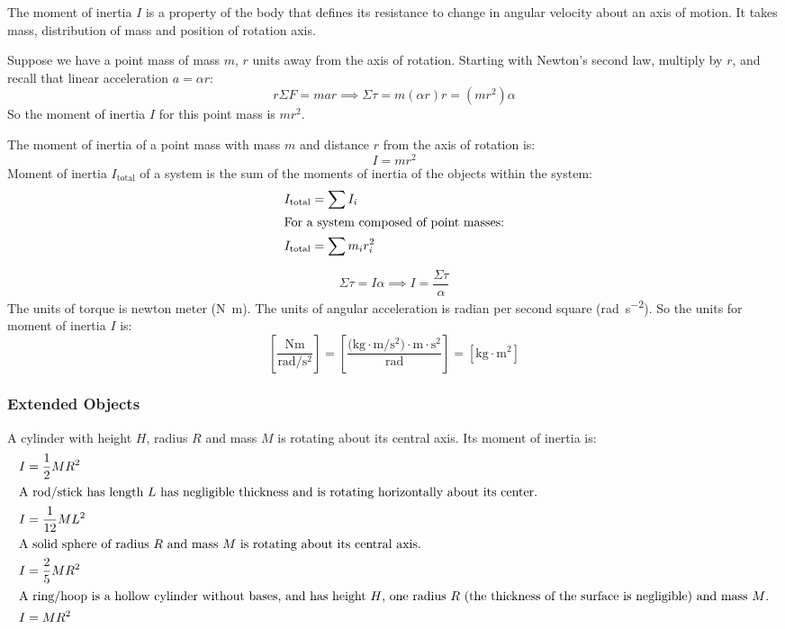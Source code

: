 \documentclass{article}
\newcommand{\theorem}[2]{\begin{tcolorbox}[title={#1},colback=blue!5!white,colframe=blue!75!black,parbox=false] #2 \end{tcolorbox}}
\begin{document}
The moment of inertia $I$ is a property of the body that defines its resistance to change in angular velocity about an axis of motion. It takes mass, distribution of mass and position of rotation axis.

Suppose we have a point mass of mass $m$, $r$ units away from the axis of rotation. Starting with Newton's second law, multiply by $r$, and recall that linear acceleration $a=\alpha r$:
\begin{equation*}
    r\Sigma F=mar
	\implies
	\Sigma \tau=m(\alpha r)r
	=\left( mr^2 \right)\alpha
\end{equation*}
So the moment of inertia $I$ for this point mass is $mr^2$.

\theorem*{
	The moment of inertia of a point mass with mass $m$ and distance $r$ from the axis of rotation is:
	\begin{equation*}
		I=mr^2
	\end{equation*}
	Moment of inertia $I_ \text{total}$ of a system is the sum of the moments of inertia of the objects within the system:
	\begin{align*}
		I_ \text{total}&=\sum I_i \\
		\intertext{For a system composed of point masses:}
		I_ \text{total}&=\sum m_ir_i^2
	\end{align*}
}

\begin{equation*}
    \Sigma \tau = I\alpha
	\implies I=\frac{\Sigma \tau}{\alpha}
\end{equation*}
The units of torque is newton meter (\si{\newton\meter}). The units of angular acceleration is radian per second square (\si{\radian\per\second^2}). So the units for moment of inertia $I$ is:
\begin{equation*}
	\left[\frac{\si{\newton\meter}}{\si{\radian\per\second^2}}\right]
	=\left[\frac{\si{(\kilo\gram\cdot\meter\per\second^2)\cdot\meter\cdot\second^2}}{\si{\radian}}\right]
	=\left[\si{\kilo\gram\cdot\meter^2}\right]
\end{equation*}

\subsubsection{Extended Objects}

A cylinder with height $H$, radius $R$ and mass $M$ is rotating about its central axis. Its moment of inertia is:
\begin{align*}
    I&=\frac12MR^2 \\
	\intertext{A rod/stick has length $L$ has negligible thickness and is rotating horizontally about its center.}
    I&=\frac{1}{12}ML^2 \\
	\intertext{A solid sphere of radius $R$ and mass $M$ is rotating about its central axis.}
    I&=\frac25MR^2 \\
	\intertext{A ring/hoop is a hollow cylinder without bases, and has height $H$, one radius $R$ (the thickness of the surface is negligible) and mass $M$.}
	I&=MR^2
\end{align*}
\end{document}
